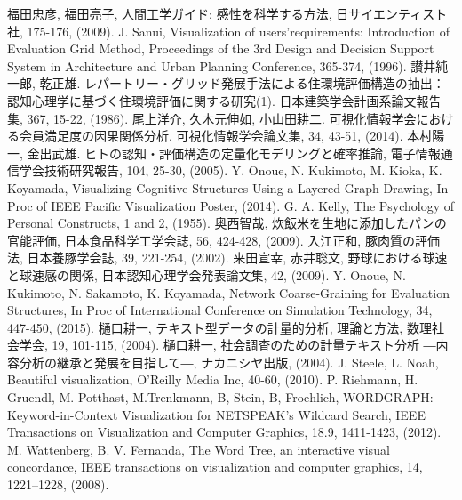 \documentclass[syuuron]{kuee}
\begin{document}


\begin{thebibliography}{数字}
	 福田忠彦, 福田亮子, 人間工学ガイド: 感性を科学する方法, 日サイエンティスト社, 175-176, (2009).
	 J. Sanui, Visualization of users’requirements: Introduction of Evaluation Grid Method, Proceedings of the 3rd Design and Decision Support System in Architecture and Urban Planning Conference, 365-374, (1996).
	 讃井純一郎, 乾正雄. レパートリー・グリッド発展手法による住環境評価構造の抽出：認知心理学に基づく住環境評価に関する研究(1). 日本建築学会計画系論文報告集, 367, 15-22, (1986).
	 尾上洋介, 久木元伸如, 小山田耕二. 可視化情報学会における会員満足度の因果関係分析. 可視化情報学会論文集, 34, 43-51, (2014).
	 本村陽一, 金出武雄. ヒトの認知・評価構造の定量化モデリングと確率推論, 電子情報通信学会技術研究報告, 104, 25-30, (2005).
	 Y. Onoue, N. Kukimoto, M. Kioka, K. Koyamada, Visualizing Cognitive Structures Using a Layered Graph Drawing, In Proc of IEEE Pacific Visualization Poster, (2014).
	 G. A. Kelly, The Psychology of Personal Constructs, 1 and 2, (1955).
	 奥西智哉, 炊飯米を生地に添加したパンの官能評価, 日本食品科学工学会誌, 56, 424-428, (2009).
	 入江正和, 豚肉質の評価法, 日本養豚学会誌, 39, 221-254, (2002).
	 来田宣幸, 赤井聡文, 野球における球速と球速感の関係, 日本認知心理学会発表論文集, 42, (2009).
	 Y. Onoue, N. Kukimoto, N. Sakamoto, K. Koyamada, Network Coarse-Graining for Evaluation Structures, In Proc of International Conference on Simulation Technology, 34, 447-450, (2015). 
	 樋口耕一, テキスト型データの計量的分析, 理論と方法, 数理社会学会, 19, 101-115, (2004).
	 樋口耕一, 社会調査のための計量テキスト分析 ―内容分析の継承と発展を目指して―, ナカニシヤ出版, (2004).
	 J. Steele, L. Noah, Beautiful visualization, O'Reilly Media Inc, 40-60, (2010).
	 P. Riehmann, H. Gruendl, M. Potthast, M.Trenkmann, B, Stein, B, Froehlich, WORDGRAPH: Keyword-in-Context Visualization for NETSPEAK's Wildcard Search, IEEE Transactions on Visualization and Computer Graphics, 18.9, 1411-1423, (2012).
	 M. Wattenberg, B. V. Fernanda, The Word Tree, an interactive visual concordance, IEEE transactions on visualization and computer graphics, 14, 1221–1228, (2008).

\end{thebibliography}
\end{document}
